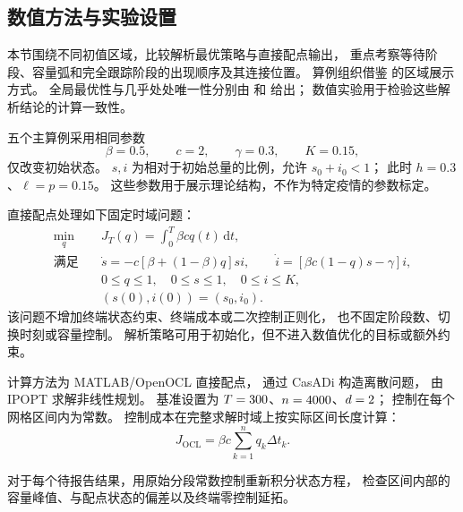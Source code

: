 \documentclass[11pt,a4paper,UTF8]{ctexart}
\theoremstyle{definition}
\begin{document}
\subsection{数值方法与实验设置}
\label{sec:numerical-method}

本节围绕不同初值区域，比较解析最优策略与直接配点输出，
重点考察等待阶段、容量弧和完全跟踪阶段的出现顺序及其连接位置。
算例组织借鉴 \citet[第6节]{AvramFreddiGoreac2022} 的区域展示方式。
全局最优性与几乎处处唯一性分别由
和
给出；
数值实验用于检验这些解析结论的计算一致性。

五个主算例采用相同参数
\begin{equation}
 \beta=0.5,\qquad c=2,\qquad\gamma=0.3,\qquad K=0.15,
 \label{eq:numerical-common-parameters}
\end{equation}
仅改变初始状态。
$s,i$ 为相对于初始总量的比例，允许 $s_0+i_0<1$；
此时 $h=0.3$、$\ell=p=0.15$。
这些参数用于展示理论结构，不作为特定疫情的参数标定。

直接配点处理如下固定时域问题：
\begin{equation}
\begin{aligned}
 \min_q\quad &J_T(q)=\int_0^T \beta cq(t)\,\mathrm dt,\\
 \text{满足}\quad
 &\dot s=-c[\beta+(1-\beta)q]si,\qquad
 \dot i=[\beta c(1-q)s-\gamma]i,\\
 &0\le q\le1,\quad 0\le s\le1,\quad0\le i\le K,\\
 &(s(0),i(0))=(s_0,i_0).
\end{aligned}
\label{eq:numerical-ocp}
\end{equation}
该问题不增加终端状态约束、终端成本或二次控制正则化，
也不固定阶段数、切换时刻或容量控制。
解析策略可用于初始化，但不进入数值优化的目标或额外约束。

计算方法为 MATLAB/OpenOCL 直接配点\citep{Koenemann2019OpenOCL}，
通过 CasADi\citep{Andersson2019CasADi} 构造离散问题，
由 IPOPT 求解非线性规划\citep{WachterBiegler2006}。
基准设置为 $T=300$、$n=4000$、$d=2$；
控制在每个网格区间内为常数。
\NumMeshDetails
控制成本在完整求解时域上按实际区间长度计算：
\begin{equation}
 J_{\mathrm{OCL}}=\beta c\sum_{k=1}^{n}q_k\Delta t_k.
 \label{eq:numerical-cost-sum}
\end{equation}

对于每个待报告结果，用原始分段常数控制重新积分状态方程，
检查区间内部的容量峰值、与配点状态的偏差以及终端零控制延拓。
\end{document}
